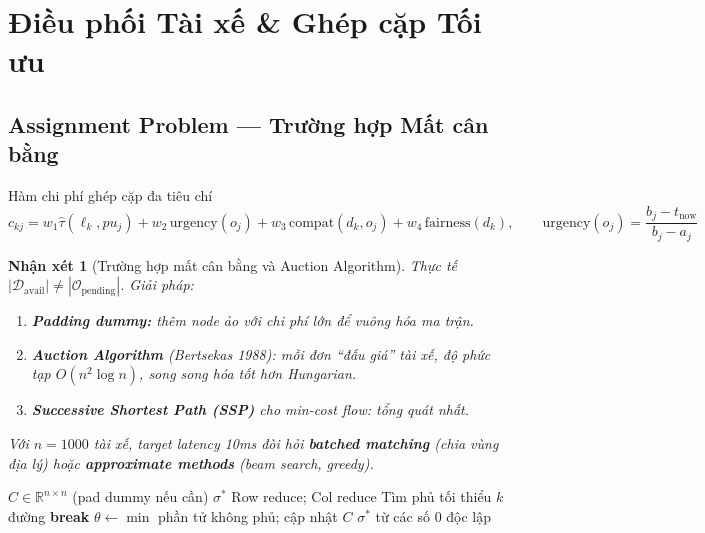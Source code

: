\documentclass[12pt,a4paper]{article}
\newtheorem{remark}{Nhận xét}[section]
\begin{document}
\section{Điều phối Tài xế \& Ghép cặp Tối ưu}

\subsection{Assignment Problem --- Trường hợp Mất cân bằng}

\begin{formulabox}{Hàm chi phí ghép cặp đa tiêu chí}
\begin{equation}
  c_{kj}
  = w_1\hat{\tau}(\ell_k,pu_j)
  + w_2\,\mathrm{urgency}(o_j)
  + w_3\,\mathrm{compat}(d_k,o_j)
  + w_4\,\mathrm{fairness}(d_k),
  \qquad
  \mathrm{urgency}(o_j)=\frac{b_j-t_{\mathrm{now}}}{b_j-a_j}
\end{equation}
\end{formulabox}

\begin{remark}[Trường hợp mất cân bằng và Auction Algorithm]
Thực tế $|\mathcal{D}_{\mathrm{avail}}|\neq|\mathcal{O}_{\mathrm{pending}}|$.
Giải pháp:
\begin{enumerate}[leftmargin=2em]
  \item \textbf{Padding dummy:} thêm node ảo với chi phí lớn để vuông hóa ma trận.
  \item \textbf{Auction Algorithm} (Bertsekas 1988): mỗi đơn ``đấu giá'' tài xế,
        độ phức tạp $O(n^2\log n)$, song song hóa tốt hơn Hungarian.
  \item \textbf{Successive Shortest Path (SSP)} cho min-cost flow: tổng quát nhất.
\end{enumerate}
Với $n=1000$ tài xế, target latency 10ms đòi hỏi \textbf{batched matching}
(chia vùng địa lý) hoặc \textbf{approximate methods} (beam search, greedy).
\end{remark}

\begin{algorithm}[H]
\caption{Hungarian (Kuhn--Munkres) --- $O(n^3)$}
\begin{algorithmic}[1]
\Require $C\in\mathbb{R}^{n\times n}$ (pad dummy nếu cần)
\Ensure $\sigma^*$
\State Row reduce; Col reduce
\Repeat
  \State Tìm phủ tối thiểu $k$ đường
   \textbf{break} \EndIf
  \State $\theta\leftarrow\min$ phần tử không phủ; cập nhật $C$
\State \Return $\sigma^*$ từ các số 0 độc lập
\end{algorithmic}
\end{algorithm}
\end{document}
